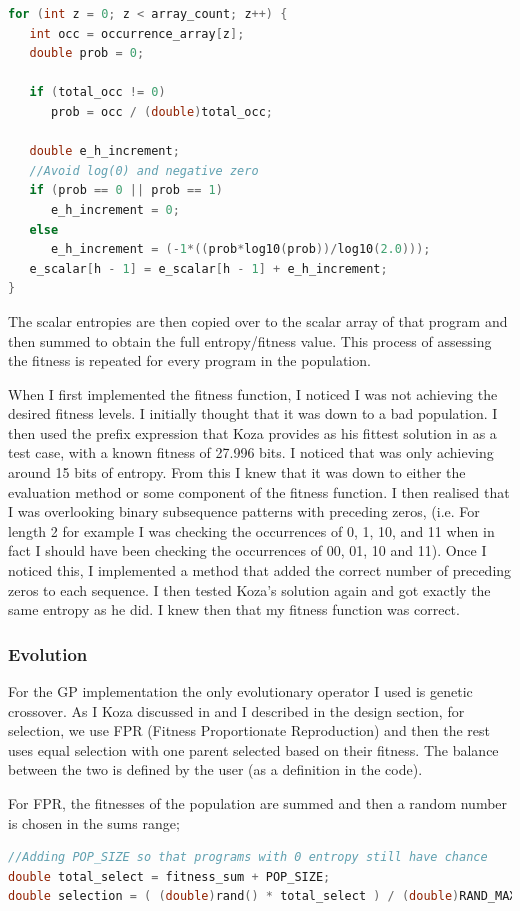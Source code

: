 \documentclass[a4paper,10.5pt]{article}
\begin{document}
\begin{lstlisting}[language=C]
for (int z = 0; z < array_count; z++) {
   int occ = occurrence_array[z];
   double prob = 0;

   if (total_occ != 0) 
      prob = occ / (double)total_occ;

   double e_h_increment;
   //Avoid log(0) and negative zero
   if (prob == 0 || prob == 1) 
      e_h_increment = 0;
   else
      e_h_increment = (-1*((prob*log10(prob))/log10(2.0)));
   e_scalar[h - 1] = e_scalar[h - 1] + e_h_increment;
}
\end{lstlisting}

The scalar entropies are then copied over to the scalar array of that program and then summed to obtain the full entropy/fitness value. This process of assessing the fitness is repeated for every program in the population.

When I first implemented the fitness function, I noticed I was not achieving the desired fitness levels. I initially thought that it was down to a bad population. I then used the prefix expression that Koza provides as his fittest solution in \cite{kozarng} as a test case, with a known fitness of 27.996 bits. I noticed that was only achieving around 15 bits of entropy. From this I knew that it was down to either the evaluation method or some component of the fitness function. I then realised that I was overlooking binary subsequence patterns with preceding zeros, (i.e. For length 2 for example I was checking the occurrences of 0, 1, 10, and 11 when in fact I should have been checking the occurrences of 00, 01, 10 and 11). Once I noticed this, I implemented a method that added the correct number of preceding zeros to each sequence. I then tested Koza's solution again and got exactly the same entropy as he did. I knew then that my fitness function was correct.

\subsubsection{Evolution}
For the GP implementation the only evolutionary operator I used is genetic crossover. As I Koza discussed in \cite{kozarng} and I described in the design section, for selection, we use FPR (Fitness Proportionate Reproduction) and then the rest uses equal selection with one parent selected based on their fitness. The balance between the two is defined by the user (as a definition in the code).

For FPR, the fitnesses of the population are summed and then a random number is chosen in the sums range;
\begin{lstlisting}[language=C]
//Adding POP_SIZE so that programs with 0 entropy still have chance
double total_select = fitness_sum + POP_SIZE; 
double selection = ( (double)rand() * total_select ) / (double)RAND_MAX;
\end{lstlisting}
\end{document}
